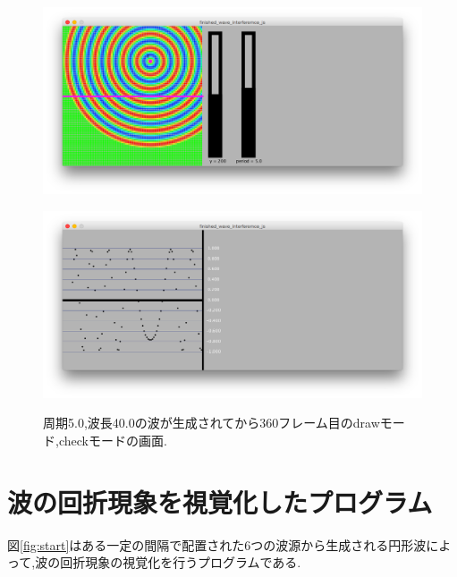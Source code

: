 \begin{figure}[htbp]
\begin{minipage}[b]{1.0\linewidth}
\centering
\includegraphics[keepaspectratio, scale=0.40]
  {../result/drawmode.png}
 \label{drawmode}
 \end{minipage}
 
\begin{minipage}[b]{1.0\linewidth}
\centering
  \includegraphics[keepaspectratio, scale=0.40]
  {../result/checkmode.png}
 \label{checkmode}
 \end{minipage}
  
  \caption{周期5.0,波長40.0の波が生成されてから360フレーム目のdrawモード,checkモードの画面.}
 \label{fig:compare}
\end{figure}



\newpage
\section{波の回折現象を視覚化したプログラム}
図\ref{fig:start}はある一定の間隔で配置された6つの波源から生成される円形波によって,波の回折現象の視覚化を行うプログラムである.

